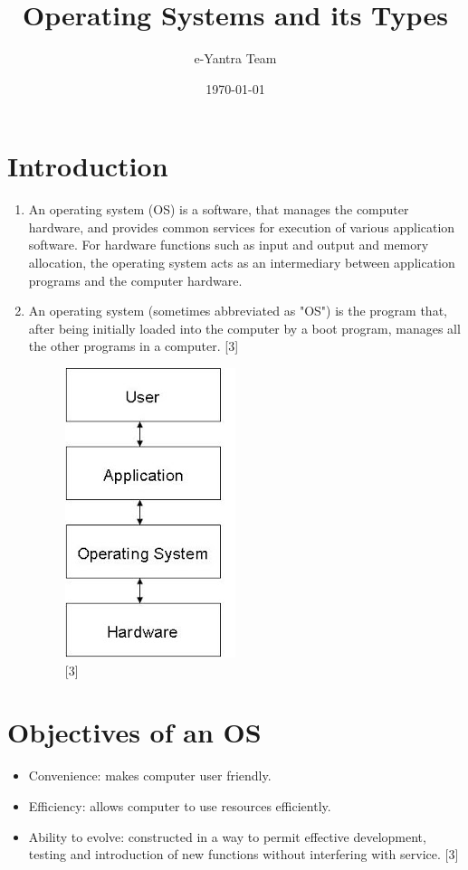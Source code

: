 \documentclass[11pt,a4paper]{article}
\title{Operating Systems and its Types}
\author{e-Yantra Team}
\date{\today}
\begin{document}
	\maketitle
	\newpage
	\tableofcontents
	\newpage
	\section{Introduction}
	\begin{enumerate}
		\item An operating system (OS) is a software, that manages the computer hardware, and provides common services for execution of various application software.  For hardware functions such as input and output and memory allocation, the operating system acts as an intermediary between application programs and the computer hardware.
		\item An operating system (sometimes abbreviated as "OS") is the program that, after being initially loaded into the computer by a boot program, manages all the other programs in a computer. [3]
		\begin{figure}[h!]
			\includegraphics[scale=0.8]{os.JPG}
			\centering
			\caption{[3]}
		\end{figure} 
	\end{enumerate} 
	\section{Objectives of an OS}
	\begin{itemize}
		\item Convenience: makes computer user friendly.
		\item Efficiency: allows computer to use resources efficiently.
		\item Ability to evolve: constructed in a way to permit effective development, testing and introduction of new functions without interfering with service. [3]
	\end{itemize}
	
\end{document}
